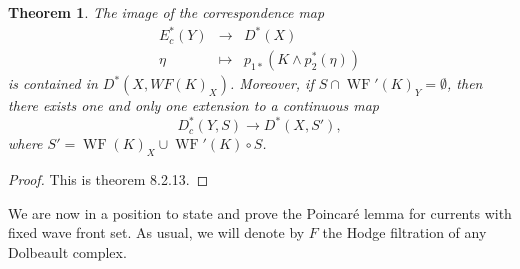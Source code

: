 \documentclass[10pt,twoside]{article}
\numberwithin{equation}{section}
\theoremstyle{plain}
\newtheorem{theorem}[equation]{Theorem}
\theoremstyle{definition}
\DeclareMathOperator{\WF}{WF}
\begin{document}
\begin{theorem}\label{thm:4} The image of the correspondence map
  \begin{displaymath}
    \begin{matrix}
      E^{\ast}_{c}(Y) & \longrightarrow & D^{\ast}(X)\\
      \eta & \longmapsto & p_{1 \ast}(K\land p_{2}^{\ast}(\eta))
    \end{matrix}
  \end{displaymath}
is contained in $ D^{\ast}(X,WF(K)_{X})$. Moreover, if $S\cap
\WF'(K)_{Y}=\emptyset$, then  
  there exists one and only one extension 
  to a continuous map
  \begin{displaymath}
    D^{\ast}_{c}(Y,S) \longrightarrow D^{\ast}(X,S'),
  \end{displaymath}
  where $S'=\WF(K)_{X}\cup \WF'(K)\circ S$.
\end{theorem}
\begin{proof}
  This is \cite{Hormander:MR1065993} theorem 8.2.13.
\end{proof}

We are now in a position to state and prove the Poincar\'e lemma for
currents with fixed wave front set.
As usual, we will
denote by $F$ the Hodge filtration of any Dolbeault complex.
  
\end{document}
